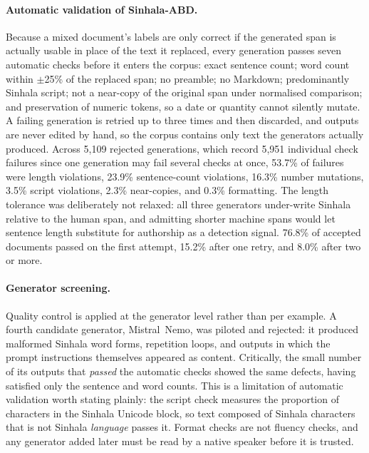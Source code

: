 \paragraph{Automatic validation of Sinhala-ABD.}
Because a mixed document's labels are only correct if the generated span is
actually usable in place of the text it replaced, every generation passes seven
automatic checks before it enters the corpus: exact sentence count; word count
within $\pm$25\% of the replaced span; no preamble; no Markdown; predominantly
Sinhala script; not a near-copy of the original span under normalised
comparison; and preservation of numeric tokens, so a date or quantity cannot
silently mutate. A failing generation is retried up to three times and then
discarded, and outputs are never edited by hand, so the corpus contains only
text the generators actually produced. Across 5{,}109 rejected generations, which record 5{,}951 individual check
failures since one generation may fail several checks at once, 53.7\% of
failures were length violations, 23.9\% sentence-count violations, 16.3\%
number mutations, 3.5\% script violations, 2.3\% near-copies, and 0.3\%
formatting. The length tolerance
was deliberately not relaxed: all three generators under-write Sinhala relative
to the human span, and admitting shorter machine spans would let sentence length
substitute for authorship as a detection signal. 76.8\% of accepted documents
passed on the first attempt, 15.2\% after one retry, and 8.0\% after two or
more.

\paragraph{Generator screening.}
Quality control is applied at the generator level rather than per example. A
fourth candidate generator, Mistral~Nemo, was piloted and rejected: it produced
malformed Sinhala word forms, repetition loops, and outputs in which the prompt
instructions themselves appeared as content. Critically, the small number of its
outputs that \emph{passed} the automatic checks showed the same defects, having
satisfied only the sentence and word counts. This is a limitation of automatic
validation worth stating plainly: the script check measures the proportion of
characters in the Sinhala Unicode block, so text composed of Sinhala characters
that is not Sinhala \emph{language} passes it. Format checks are not fluency
checks, and any generator added later must be read by a native speaker before
it is trusted. 


